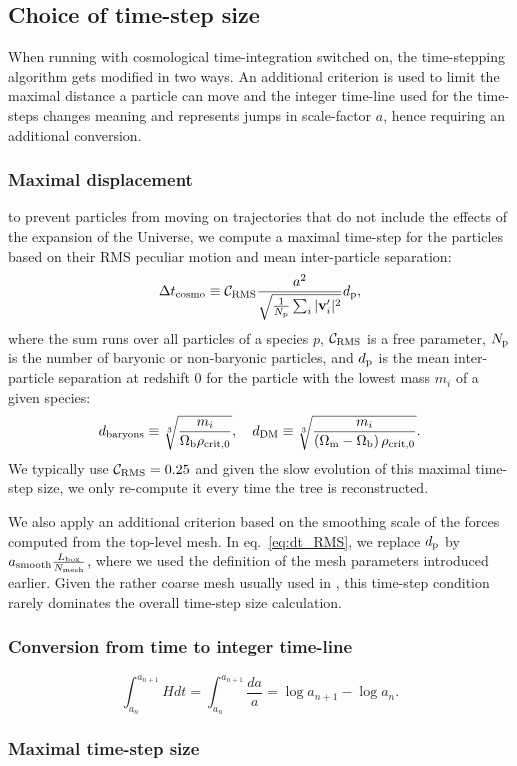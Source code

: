 \subsection{Choice of time-step size}
\label{ssec:timesteps}

When running \swift with cosmological time-integration switched on, the
time-stepping algorithm gets modified in two ways. An additional criterion is
used to limit the maximal distance a particle can move and the integer time-line
used for the time-steps changes meaning and represents jumps in scale-factor $a$, 
hence requiring an additional conversion.

\subsubsection{Maximal displacement}

to prevent particles from moving on trajectories that do not include
the effects of the expansion of the Universe, we compute a maximal
time-step for the particles based on their RMS peculiar motion and
mean inter-particle separation:
\begin{equation}
  \Delta t_{\rm cosmo} \equiv \mathcal{C}_{\rm RMS} \frac{a^2}{\sqrt{\frac{1}{N_{\rm p}}\sum_i | \mathbf{v}_i' |^2}} d_{\rm p},
  \label{eq:dt_RMS}
\end{equation}
where the sum runs over all particles of a species $p$,
$\mathcal{C}_{\rm RMS}$ is a free parameter, $N_{\rm p}$ is the number
of baryonic or non-baryonic particles, and $d_{\rm p}$ is the mean
inter-particle separation at redshift $0$ for the particle with the
lowest mass $m_i$ of a given species:
\begin{equation}
  d_{\rm baryons} \equiv \sqrt[3]{\frac{m_i}{\Omega_{\rm b} \rho_{\rm crit, 0}}}, \quad d_{\rm DM} \equiv \sqrt[3]{\frac{m_i}{\left(\Omega_{\rm m} - \Omega_{\rm b}\right) \rho_{\rm crit, 0}}}.
  \nonumber
\end{equation}
We typically use $\mathcal{C}_{\rm RMS} = 0.25$ and given the slow
evolution of this maximal time-step size, we only re-compute it every
time the tree is reconstructed.

We also apply an additional criterion based on the smoothing scale of
the forces computed from the top-level mesh.  In eq.~\ref{eq:dt_RMS},
we replace $d_{\rm p}$ by
$a_{\rm smooth} \frac{L_{\rm box}}{N_{\rm mesh}}$, where we used the
definition of the mesh parameters introduced earlier. Given the rather
coarse mesh usually used in \swift, this time-step condition rarely
dominates the overall time-step size calculation.

\subsubsection{Conversion from time to integer time-line} 

\begin{equation}
  \int_{a_n}^{a_{n+1}} H dt = \int_{a_n}^{a_{n+1}} \frac{da}{a} =
  \log{a_{n+1}} - \log{a_n}.
\end{equation}

\subsubsection{Maximal time-step size}